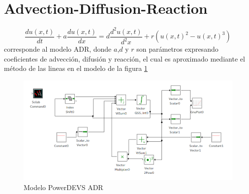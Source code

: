 \documentclass{beamer}
\begin{document}
\section{Advection-Diffusion-Reaction}
\begin{frame}
\begin{equation*}
\frac{du(x,t)}{dt} + a \frac{du(x,t)}{dx} = d\frac{d^2u(x,t)}{d^2x} + r(u(x,t)^2 - u(x,t)^3)
\end{equation*}
corresponde al modelo ADR, donde $a$,$d$ y $r$ son parámetros expresando coeficientes de advección, difusión y reacción, 
el cual es aproximado mediante el método de las lineas \cite{BKP13} en el modelo de la figura \ref{model:adr}
\end{frame}

\begin{frame}
\begin{figure}[H]
 \includegraphics[width=0.75\linewidth]{adr-pwd}
\caption{Modelo PowerDEVS ADR}\label{model:adr}
\end{figure}
\end{frame}
\end{document}

